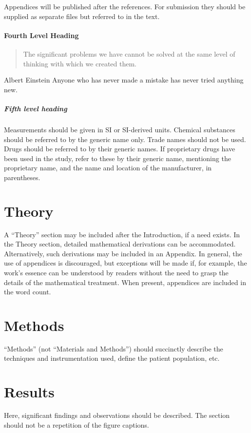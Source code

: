 \documentclass[num-refs]{wiley-article}
\begin{document}
Appendices will be published after the references. 
For submission they should be supplied as separate files but referred to in the text.

\paragraph{Fourth Level Heading}
\begin{quote}
The significant problems we have cannot be solved at the same level of thinking with which we created them.
\end{quote}

\begin{epigraph}{Albert Einstein}
Anyone who has never made a mistake has never tried anything new.
\end{epigraph}

\subparagraph{Fifth level heading}
Measurements should be given in SI or SI-derived units.
Chemical substances should be referred to by the generic name only. 
Trade names should not be used. 
Drugs should be referred to by their generic names. 
If proprietary drugs have been used in the study, refer to these by their generic name, mentioning the proprietary name, and the name and location of the manufacturer, in parentheses.

\section{Theory}
A “Theory” section may be included after the Introduction, if a need exists. 
In the Theory section, detailed mathematical derivations can be accommodated. 
Alternatively, such derivations may be included in an Appendix. 
In general, the use of appendices is discouraged, but exceptions will be made if, for example, the work’s essence can be understood by readers without the need to grasp the details of the mathematical treatment. 
When present, appendices are included in the word count.

\section{Methods}
“Methods” (not “Materials and Methods”) should succinctly describe the techniques and instrumentation used, define the patient population, etc.

\section{Results}
Here, significant findings and observations should be described. 
The section should not be a repetition of the figure captions.
\end{document}
